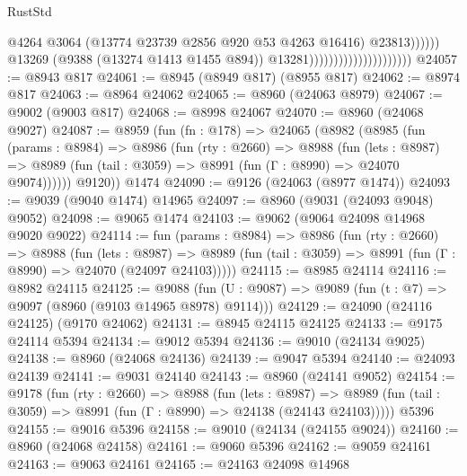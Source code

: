 \begin{lexlean}{RustStd}
\begin{coremodule}
                                                          @4264
                                                          @3064
                                                          (@13774
                                                            @23739
                                                            @2856
                                                            @920
                                                            @53
                                                            @4263
                                                            @16416)
                                                          @23813))))))
                                              @13269
                                              (@9388 (@13274 @1413 @1455 @894))
                                              @13281)))))))))))))))))))))
@24057 := @8943 @817
@24061 := @8945 (@8949 @817) (@8955 @817)
@24062 := @8974 @817
@24063 := @8964 @24062
@24065 := @8960 (@24063 @8979)
@24067 := @9002 (@9003 @817)
@24068 := @8998 @24067
@24070 := @8960 (@24068 @9027)
@24087 := @8959
    (fun (fn : @178) =>
    @24065
      (@8982
        (@8985
          (fun (params : @8984) =>
          @8986
            (fun (rty : @2660) =>
            @8988
              (fun (lets : @8987) =>
              @8989 (fun (tail : @3059) => @8991 (fun (Γ : @8990) => @24070 @9074))))))
        @9120))
    @1474
@24090 := @9126 (@24063 (@8977 @1474))
@24093 := @9039 (@9040 @1474) @14965
@24097 := @8960 (@9031 (@24093 @9048) @9052)
@24098 := @9065 @1474
@24103 := @9062 (@9064 @24098 @14968 @9020 @9022)
@24114 := fun (params : @8984) =>
  @8986
    (fun (rty : @2660) =>
    @8988
      (fun (lets : @8987) =>
      @8989 (fun (tail : @3059) => @8991 (fun (Γ : @8990) => @24070 (@24097 @24103)))))
@24115 := @8985 @24114
@24116 := @8982 @24115
@24125 := @9088
    (fun (U : @9087) => @9089 (fun (t : @7) => @9097 (@8960 (@9103 @14965 @8978) @9114)))
@24129 := @24090 (@24116 @24125) (@9170 @24062)
@24131 := @8945 @24115 @24125
@24133 := @9175 @24114 @5394
@24134 := @9012 @5394
@24136 := @9010 (@24134 @9025)
@24138 := @8960 (@24068 @24136)
@24139 := @9047 @5394
@24140 := @24093 @24139
@24141 := @9031 @24140
@24143 := @8960 (@24141 @9052)
@24154 := @9178
    (fun (rty : @2660) =>
    @8988
      (fun (lets : @8987) =>
      @8989 (fun (tail : @3059) => @8991 (fun (Γ : @8990) => @24138 (@24143 @24103)))))
    @5396
@24155 := @9016 @5396
@24158 := @9010 (@24134 (@24155 @9024))
@24160 := @8960 (@24068 @24158)
@24161 := @9060 @5396
@24162 := @9059 @24161
@24163 := @9063 @24161
@24165 := @24163 @24098 @14968

\end{coremodule}
\end{lexlean}
